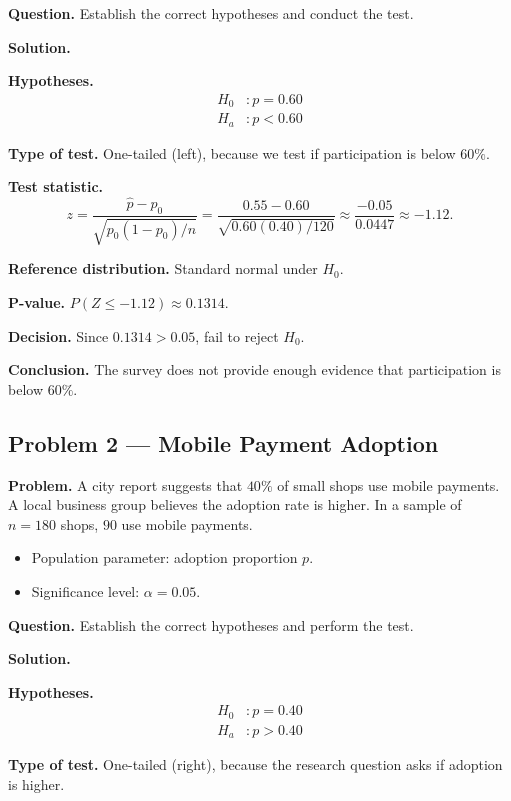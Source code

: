 	\textbf{Question.} Establish the correct hypotheses and conduct the test.
	
	\textbf{Solution.}
	
	\textbf{Hypotheses.}
	\[
	\begin{aligned}
		H_0&: p = 0.60 \\
		H_a&: p < 0.60
	\end{aligned}
	\]
	
	\textbf{Type of test.} One-tailed (left), because we test if participation is below $60\%$.
	
	\textbf{Test statistic.}
	\[
	z = \frac{\hat{p}-p_0}{\sqrt{p_0(1-p_0)/n}} = \frac{0.55-0.60}{\sqrt{0.60(0.40)/120}} \approx \frac{-0.05}{0.0447} \approx -1.12.
	\]
	
	\textbf{Reference distribution.} Standard normal under $H_0$.
	
	\textbf{P-value.} $P(Z\le -1.12)\approx 0.1314$.
	
	\textbf{Decision.} Since $0.1314>0.05$, fail to reject $H_0$.
	
	\textbf{Conclusion.} The survey does not provide enough evidence that participation is below $60\%$.
	
	\hypertarget{c6-ex2}{}
	\subsection*{Problem 2 — Mobile Payment Adoption}
	
	\textbf{Problem.} A city report suggests that $40\%$ of small shops use mobile payments. A local business group believes the adoption rate is higher. In a sample of $n=180$ shops, $90$ use mobile payments.
	\begin{itemize}
		\item Population parameter: adoption proportion $p$.
		\item Significance level: $\alpha=0.05$.
	\end{itemize}
	
	\textbf{Question.} Establish the correct hypotheses and perform the test.
	
	\textbf{Solution.}
	
	\textbf{Hypotheses.}
	\[
	\begin{aligned}
		H_0&: p = 0.40 \\
		H_a&: p > 0.40
	\end{aligned}
	\]
	
	\textbf{Type of test.} One-tailed (right), because the research question asks if adoption is higher.
	
